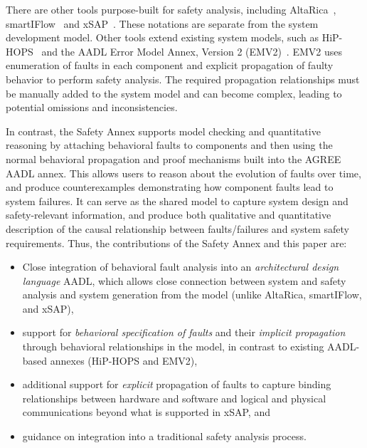 There are other tools purpose-built for safety analysis, including AltaRica~\cite{PROSVIRNOVA2013127}, smartIFlow~\cite{info8010007} and xSAP~\cite{DBLP:conf/tacas/BittnerBCCGGMMZ16}. These notations are separate from the system development model. Other tools extend existing system models, such as HiP-HOPS~\cite{CHEN201391} and the AADL Error Model Annex, Version 2 (EMV2)~\cite{EMV2}. EMV2 uses enumeration of faults in each component and explicit propagation of faulty behavior to perform safety analysis. The required propagation relationships must be manually added to the system model and can become complex, leading to potential omissions and inconsistencies.  

In contrast, the Safety Annex supports model checking and quantitative reasoning by attaching behavioral faults to components and then using the normal behavioral propagation and proof mechanisms built into the AGREE AADL annex. This allows users to reason about the evolution of faults over time, and produce counterexamples demonstrating how component faults lead to system failures. It can serve as the shared model to capture system design and safety-relevant information, and produce both qualitative and quantitative description of the causal relationship between faults/failures and system safety requirements.
%
Thus, the contributions of the Safety Annex and this paper are:
\begin{itemize}
\item Close integration of behavioral fault analysis into an {\em architectural design language} AADL, which allows close connection between system and safety analysis and system generation from the model (unlike AltaRica, smartIFlow, and xSAP),
\item support for {\em behavioral specification of faults} and their {\em implicit propagation} through behavioral relationships in the model, in contrast to existing AADL-based annexes (HiP-HOPS and EMV2),
\item additional support for {\em explicit} propagation of faults to capture binding relationships between hardware and software and logical and physical communications beyond what is supported in xSAP, and
\item guidance on integration into a traditional safety analysis process.
\end{itemize}
